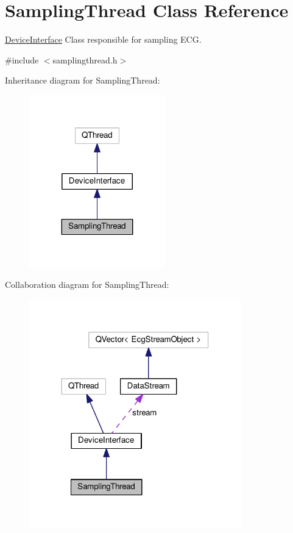 \hypertarget{classSamplingThread}{}\section{Sampling\+Thread Class Reference}
\label{classSamplingThread}


\hyperlink{classDeviceInterface}{Device\+Interface} Class responsible for sampling E\+CG.  




{\ttfamily \#include $<$samplingthread.\+h$>$}



Inheritance diagram for Sampling\+Thread\+:\nopagebreak
\begin{figure}[H]
\begin{center}
\leavevmode
\includegraphics[width=167pt]{classSamplingThread__inherit__graph}
\end{center}
\end{figure}


Collaboration diagram for Sampling\+Thread\+:\nopagebreak
\begin{figure}[H]
\begin{center}
\leavevmode
\includegraphics[width=261pt]{classSamplingThread__coll__graph}
\end{center}
\end{figure}
